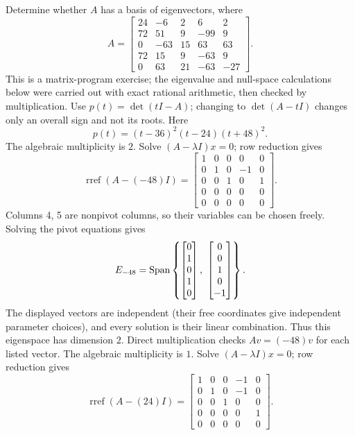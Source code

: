\goal Determine whether $A$ has a basis of eigenvectors, where
\[A=\begin{bmatrix}24&-6&2&6&2\\72&51&9&-99&9\\0&-63&15&63&63\\72&15&9&-63&9\\0&63&21&-63&-27\end{bmatrix}.\]
This is a matrix-program exercise; the eigenvalue and null-space calculations below were carried out with exact rational arithmetic, then checked by multiplication.
Use $p(t)=\det(tI-A)$; changing to $\det(A-tI)$ changes only an overall sign and not its roots. Here
\[p(t)=\left(t - 36\right)^{2} \left(t - 24\right) \left(t + 48\right)^{2}.\]
The algebraic multiplicity is $2$. Solve $(A-\lambda I)x=0$; row reduction gives
\[\operatorname{rref}(A-(-48)I)=\begin{bmatrix}1&0&0&0&0\\0&1&0&-1&0\\0&0&1&0&1\\0&0&0&0&0\\0&0&0&0&0\end{bmatrix}.\]
Columns 4, 5 are nonpivot columns, so their variables can be chosen freely. Solving the pivot equations gives
\[E_{-48}=\Span\left\{\begin{bmatrix}0\\1\\0\\1\\0\end{bmatrix},\ \begin{bmatrix}0\\0\\1\\0\\-1\end{bmatrix}\right\}.\]
The displayed vectors are independent (their free coordinates give independent parameter choices), and every solution is their linear combination. Thus this eigenspace has dimension $2$. Direct multiplication checks $Av=(-48)v$ for each listed vector.
The algebraic multiplicity is $1$. Solve $(A-\lambda I)x=0$; row reduction gives
\[\operatorname{rref}(A-(24)I)=\begin{bmatrix}1&0&0&-1&0\\0&1&0&-1&0\\0&0&1&0&0\\0&0&0&0&1\\0&0&0&0&0\end{bmatrix}.\]
